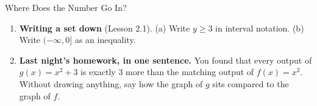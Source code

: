 \documentclass[10pt]{article}
\begin{document}
\begin{notesbox}{Where Does the Number Go In?}
\begin{enumerate}[leftmargin=1.6em, itemsep=4pt, topsep=4pt]

\item \textbf{Writing a set down} (Lesson 2.1). \quad (a) Write $y \ge 3$ in interval notation.
\quad (b) Write $(-\infty, 0]$ as an inequality.


\item \textbf{Last night's homework, in one sentence.} You found that every output of
$g(x)=x^2+3$ is exactly $3$ more than the matching output of $f(x)=x^2$. Without drawing
anything, say how the graph of $g$ sits compared to the graph of $f$.


\end{enumerate}
\end{notesbox}
\end{document}
